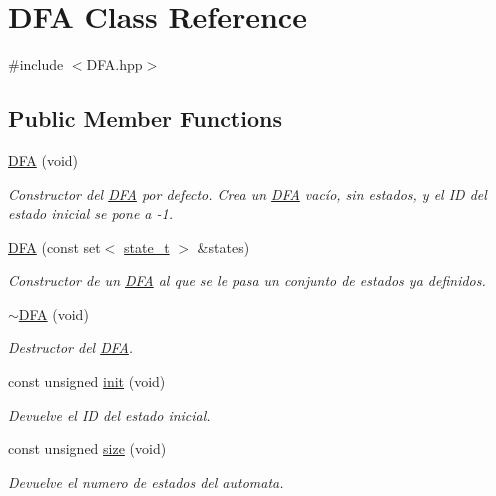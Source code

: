 \hypertarget{class_d_f_a}{}\section{D\+FA Class Reference}
\label{class_d_f_a}


{\ttfamily \#include $<$D\+F\+A.\+hpp$>$}

\subsection*{Public Member Functions}
\begin{DoxyCompactItemize}
\item 
\hyperlink{class_d_f_a_a22147c876a89b6342512b13b20dd5fcd}{D\+FA} (void)
\begin{DoxyCompactList}\small\item\em Constructor del \hyperlink{class_d_f_a}{D\+FA} por defecto. Crea un \hyperlink{class_d_f_a}{D\+FA} vacío, sin estados, y el ID del estado inicial se pone a -\/1. \end{DoxyCompactList}\item 
\hyperlink{class_d_f_a_a58748588a492bf8c3f5dd9bb1310aa41}{D\+FA} (const set$<$ \hyperlink{classstate__t}{state\+\_\+t} $>$ \&states)
\begin{DoxyCompactList}\small\item\em Constructor de un \hyperlink{class_d_f_a}{D\+FA} al que se le pasa un conjunto de estados ya definidos. \end{DoxyCompactList}\item 
\hyperlink{class_d_f_a_aa6398a02d0f2d3a57cee0c7d8b3ec9e1}{$\sim$\+D\+FA} (void)
\begin{DoxyCompactList}\small\item\em Destructor del \hyperlink{class_d_f_a}{D\+FA}. \end{DoxyCompactList}\item 
const unsigned \hyperlink{class_d_f_a_a97e39f09fca7cbe4d2674797b0fdaabc}{init} (void)
\begin{DoxyCompactList}\small\item\em Devuelve el ID del estado inicial. \end{DoxyCompactList}\item 
const unsigned \hyperlink{class_d_f_a_a60333433beecab40b2e6eb8874de8524}{size} (void)
\begin{DoxyCompactList}\small\item\em Devuelve el numero de estados del automata. \end{DoxyCompactList}\item 

\end{DoxyCompactItemize}
